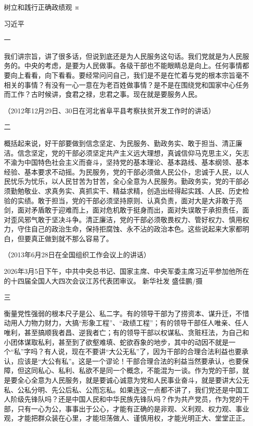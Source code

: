 \documentclass[UTF8,zihao=-4]{ctexart}
\begin{document}
树立和践行正确政绩观 ※

习近平

一

我们讲宗旨，讲了很多话，但说到底还是为人民服务这句话。我们党就是为人民服务的。中央的考虑，是要为人民做事。各级干部也不能眼睛总是向上。任何事情都要向上看看，向下看看。要经常问问自己，我们是不是在忙着与党的根本宗旨毫不相关的事情？有没有一心一意在为老百姓做事情？是不是在围绕党和国家中心任务而工作？古时候讲，食君之禄，忠君之事。现在就是要服务人民。

（2012年12月29日、30日在河北省阜平县考察扶贫开发工作时的讲话）

二

概括起来说，好干部要做到信念坚定、为民服务、勤政务实、敢于担当、清正廉洁。信念坚定，党的干部必须坚定共产主义远大理想，真诚信仰马克思主义，矢志不渝为中国特色社会主义而奋斗，坚持党的基本理论、基本路线、基本纲领、基本经验、基本要求不动摇。为民服务，党的干部必须做人民公仆，忠诚于人民，以人民忧乐为忧乐，以人民甘苦为甘苦，全心全意为人民服务。勤政务实，党的干部必须勤勉敬业、求真务实、真抓实干、精益求精，创造出经得起实践、人民、历史检验的实绩。敢于担当，党的干部必须坚持原则、认真负责，面对大是大非敢于亮剑，面对矛盾敢于迎难而上，面对危机敢于挺身而出，面对失误敢于承担责任，面对歪风邪气敢于坚决斗争。清正廉洁，党的干部必须敬畏权力、管好权力、慎用权力，守住自己的政治生命，保持拒腐蚀、永不沾的政治本色。这些说起来大家都明白，但要真正做到就不那么容易了。

（2013年6月28日在全国组织工作会议上的讲话）

2026年3月5日下午，中共中央总书记、国家主席、中央军委主席习近平参加他所在的十四届全国人大四次会议江苏代表团审议。 新华社发 盛佳鹏/摄

三

衡量党性强弱的根本尺子是公、私二字。有的领导干部为了捞资本、谋升迁，不惜动用人力物力财力，大搞“形象工程”、“政绩工程”；有的领导干部任人唯亲、任人唯利，甚至搞顺我者昌、逆我者亡；有的领导干部以权谋私、贪赃枉法，为自己和小团体谋取私利，甚至到了欲壑难填、蛇欲吞象的地步，其中的动因不就是一个“私”字吗？有人说，现在不要讲“大公无私”了，因为干部的合理合法利益也要承认，应该是“大公有私”。这是一个谬论！干部合理合法的利益当然要承认，也要保障，但这同私心、私利、私欲不是同一个概念，不能混为一谈。作为党的干部，就是要全心全意为人民服务，就是要诚心诚意为党和人民事业奋斗，就是要讲大公无私、公私分明、先公后私、公而忘私。如果连这一点都不讲了，我们党还是中国工人阶级先锋队吗？还是中国人民和中华民族先锋队吗？作为共产党员，作为党的干部，只有一心为公，事事出于公心，才能有正确的是非观、义利观、权力观、事业观，才能把群众装在心里，才能坦荡做人、谨慎用权，才能光明正大、堂堂正正。
\end{document}

